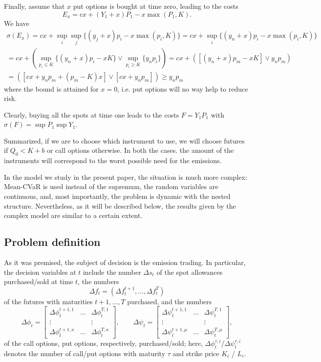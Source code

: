 \documentclass[3p,times]{elsarticle}
\begin{document}
Finally, assume that $x$ put options is bought at time zero, leading to the costs
$$
E_x = cx + (Y_1 + x) P_1 - x \max(P_1,K).
$$
We have
\begin{multline*}
\sigma(E_x)= cx + \sup_i \sup_j \{(y_j + x) p_i - x \max(p_i,K)\}
=cx + \sup_i\{ (y_n + x) p_i - x \max(p_i,K)\}
\\
=cx + 
\left(
\sup_{p_i \leq K}\{ (y_n + x) p_i - x K\} \vee 
\sup_{p_i \geq K}\{ y_n p_i \}\right)
=cx + 
\left(
[(y_n + x) p_m - x K] \vee  y_n p_m \right)
\\=
\left(
[cx+y_np_m + (p_m-K) x] 
\vee 
[cx+ y_n p_m] 
\right)
\geq y_n p_m
\end{multline*}
where the bound is attained for $x=0$, i.e. put options will no way help to reduce risk.

Clearly, buying all the spots at time one leads to the costs $F = Y_1 P_1$ with $\sigma(F)=\sup P_1 \sup Y_1$.

Summarized, if we are to choose which instrument to use, we will choose futures if $Q_0 < K+b$ or call options otherwise. In both the cases. the amount of the instruments will correspond to the worst possible need for the emissions.

In the model we study in the present paper, the situation is much more complex: Mean-CVaR is used instead of the supremum, the random variables are continuous, and, most importantly, the problem is dynamic with the nested structure. Nevertheless, as it will be described below, the results given by the complex model are similar to a certain extent.

\subsection*{Problem definition}


As it was premised, the subject of decision is the emission trading. In particular, the decision variables at $t$ include the number $\Delta s_{t}$ of
the spot allowances purchased/sold at time $t$, the numbers $$\Delta f_{t}=(\Delta f_{t}^{t+1},\dots,\Delta f_{t}^{T})$$
of the futures with maturities $t+1,\dots,T$ purchased, and the numbers 
\[
\Delta \phi_{t}=\left[\begin{array}{ccc}
\Delta \phi_{t}^{t+1,1} & \dots & \Delta \phi_{t}^{T,1}\\
\vdots &  & \vdots\\
\Delta \phi_{t}^{t+1,\kappa} & \dots & \Delta \phi_{t}^{T,\kappa}
\end{array}\right],
\qquad
\Delta \psi_{t}=\left[\begin{array}{ccc}
\Delta \psi_{t}^{t+1,1} & \dots & \Delta \psi_{t}^{T,1}\\
\vdots &  & \vdots\\
\Delta \psi_{t}^{t+1,\mu} & \dots & \Delta \psi_{t}^{T,\mu}
\end{array}\right],
\]
of the call options, put options, respectively, purchased/sold; here, $\Delta \phi_t^{\tau,i}$/$\Delta \psi_t^{\tau,i}$ denotes the number of call/put options with maturity $\tau$ and strike price $K_i$ / $L_i$.
\end{document}
